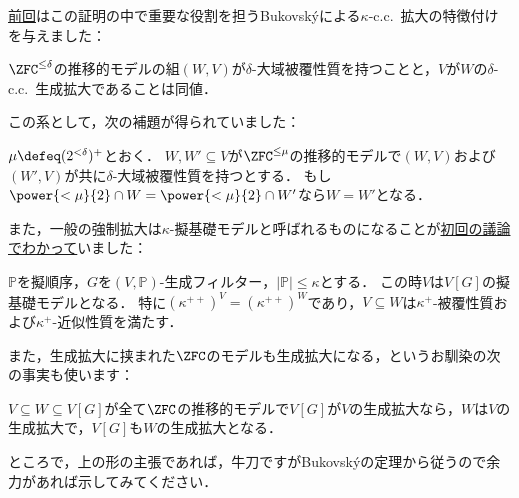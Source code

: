 \documentclass[a4j,leqno]{ltjsarticle}
\newcommand{\cc}{c.c.\ }
\begin{document}
\href{http://konn-san.com/math/geology-bukovsky-theorem.html}{前回}はこの証明の中で重要な役割を担うBukovsk\'{y}による$\kappa$-\cc{}拡大の特徴付けを与えました：
\begin{theorem}\label{thm:bukovsky}
 $\ZFC^{\leq \delta}$の推移的モデルの組$(W, V)$が$\delta$-大域被覆性質を持つことと，$V$が$W$の$\delta$-\cc{}生成拡大であることは同値．
\end{theorem}
この系として，次の補題が得られていました：
\begin{lemma}\label{lem:global-covering-unique}
 $\mu \defeq (2^{<\delta})^+$とおく．
 $W, W' \subseteq V$が$\ZFC^{\leq\mu}$の推移的モデルで$(W, V)$および$(W', V)$が共に$\delta$-大域被覆性質を持つとする．
 もし$\power{<\mu}{2} \cap W = \power{<\mu}{2} \cap W'$なら$W = W'$となる．
\end{lemma}
また，一般の強制拡大は$\kappa$-擬基礎モデルと呼ばれるものになることが\href{http://konn-san.com/math/geology-ground-definability.html\#lem:ground-is-pseudoground}{初回の議論でわかって}いました：
\begin{lemma}\label{lem:ground-is-pseudoground}
 $\mathbb{P}$を擬順序，$G$を$(V, \mathbb{P})$-生成フィルター，$|\mathbb{P}| \leq \kappa$とする．
 この時$V$は$V[G]$の擬基礎モデルとなる．
 特に$(\kappa^{++})^V = (\kappa^{++})^W$であり，$V \subseteq W$は$\kappa^+$-被覆性質および$\kappa^+$-近似性質を満たす．
\end{lemma}
また，生成拡大に挟まれた$\ZFC$のモデルも生成拡大になる，というお馴染の次の事実も使います：
\begin{fact}[中間拡大補題]\label{lem:interm-ext}
 $V \subseteq W \subseteq V[G]$が全て$\ZFC$の推移的モデルで$V[G]$が$V$の生成拡大なら，$W$は$V$の生成拡大で，$V[G]$も$W$の生成拡大となる．
\end{fact}
ところで，上の形の主張であれば，牛刀ですがBukovsk\'{y}の定理から従うので余力があれば示してみてください．
\end{document}
